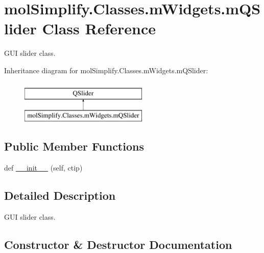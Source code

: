\hypertarget{classmolSimplify_1_1Classes_1_1mWidgets_1_1mQSlider}{}\section{mol\+Simplify.\+Classes.\+m\+Widgets.\+m\+Q\+Slider Class Reference}
\label{classmolSimplify_1_1Classes_1_1mWidgets_1_1mQSlider}


G\+UI slider class.  


Inheritance diagram for mol\+Simplify.\+Classes.\+m\+Widgets.\+m\+Q\+Slider\+:\begin{figure}[H]
\begin{center}
\leavevmode
\includegraphics[height=2.000000cm]{classmolSimplify_1_1Classes_1_1mWidgets_1_1mQSlider}
\end{center}
\end{figure}
\subsection*{Public Member Functions}
\begin{DoxyCompactItemize}
\item 
def \hyperlink{classmolSimplify_1_1Classes_1_1mWidgets_1_1mQSlider_a73ea6d61500daa421d1e9ae108a56f01}{\+\_\+\+\_\+init\+\_\+\+\_\+} (self, ctip)
\end{DoxyCompactItemize}


\subsection{Detailed Description}
G\+UI slider class. 

\subsection{Constructor \& Destructor Documentation}
\mbox{\label{classmolSimplify_1_1Classes_1_1mWidgets_1_1mQSlider_a73ea6d61500daa421d1e9ae108a56f01}} 
